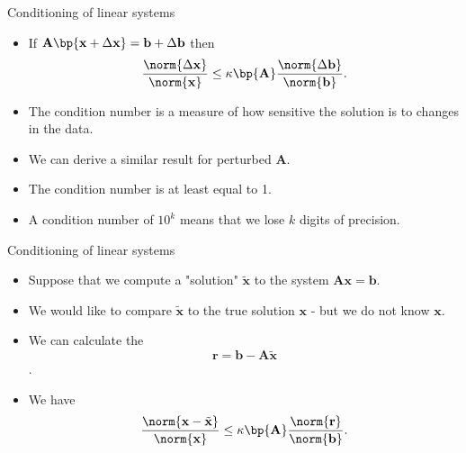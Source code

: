\documentclass[11pt,xcolor={dvipsnames},aspectratio=159,hyperref={pdftex,pdfpagemode=UseNone,hidelinks,pdfdisplaydoctitle=true},usepdftitle=false]{beamer}
\begin{document}
\begin{frame}{Conditioning of linear systems}
    \begin{itemize} 
        \item If $\mathbf{A}\bp{\mathbf{x} +\Delta \mathbf{ x}} = \mathbf{b} + \Delta \mathbf{b}$ then \begin{align*}
        \frac{\norm{\Delta \mathbf{x}}}{\norm{\mathbf{x}}} \leq \kappa\bp{\mathbf{A}} \frac{\norm{\Delta \mathbf{b}}}{\norm{\mathbf{b}}}.
            \end{align*}
        \item The condition number is a measure of how sensitive the solution is to changes in the data.
        \item We can derive a similar result for perturbed $\mathbf{A}$.
        \item The condition number is at least equal to 1.
        \item A condition number of $10^k$ means that we lose $k$ digits of precision.
            \end{itemize}
\end{frame}

\begin{frame}{Conditioning of linear systems}
    \begin{itemize} 
        \item Suppose that we compute a "solution" $\tilde{\mathbf{x}}$ to the system $\mathbf{A}\mathbf{x} = \mathbf{b}$.
        \item We would like to compare $\tilde{\mathbf{x}}$ to the true solution $\mathbf{x}$ - but we do not know $\mathbf{x}$.
        \item We can calculate the  $$\mathbf{r} = \mathbf{b} - \mathbf{A}\tilde{\mathbf{x}}$$.
        \item We have \begin{align*}
        \frac{\norm{\mathbf{x} - \tilde{\mathbf{x}}}}{\norm{\mathbf{x}}} \leq \kappa\bp{\mathbf{A}} \frac{\norm{\mathbf{r}}}{\norm{\mathbf{b}}}.
        \end{align*}
        \end{itemize}
\end{frame}
\end{document}
